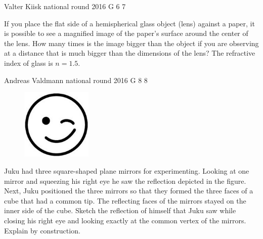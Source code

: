 \documentclass[11pt]{article}
\begin{document}
{Valter Kiisk} %
{national round} %
{2016} %
{G 6} %
{7} %
{

\ifEngStatement
If you place the flat side of a hemispherical glass object (lens) against a paper, it is possible to see a magnified image of the paper’s surface around the center of the lens. How many times is the image bigger than the object if you are observing at a distance that is much bigger than the dimensions of the lens? The refractive index of glass is $n=\num{1.5}$.
\fi
}

{Andreas Valdmann} %
{national round} %
{2016} %
{G 8} %
{8} %
{

\ifEngStatement
\begin{figure}
	\vspace{-25pt}
	\begin{center}
		\includegraphics[width=0.3\textwidth]{2016-v3g-08-wink}
	\end{center}
	\vspace{-20pt}
\end{figure}
Juku had three square-shaped plane mirrors for experimenting. Looking at one mirror and squeezing his right eye he saw the reflection depicted in the figure. Next, Juku positioned the three mirrors so that they formed the three faces of a cube that had a common tip. The reflecting faces of the mirrors stayed on the inner side of the cube. Sketch the reflection of himself that Juku saw while closing his right eye and looking exactly at the common vertex of the mirrors. Explain by construction.
\fi
}
\end{document}

